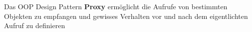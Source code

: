 Das OOP Design Pattern \textbf{Proxy} ermöglicht die Aufrufe von bestimmten Objekten zu empfangen und gewisses Verhalten vor und nach dem eigentlichten Aufruf zu definieren